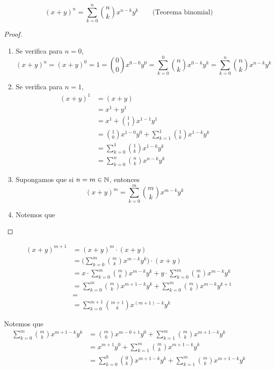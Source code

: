 \[(x+ y)^n = \sum_{k=0}^{n} \binom{n}{k} x^{n-k}y^k \qquad \text{(Teorema binomial)}\]

\begin{proof}\leavevmode
  
  \begin{enumerate}[label=\roman*)]
    \item Se verifica para $n=0$, \[(x+ y)^n = (x+ y)^0= 1= \binom{0}{0} x^{0-0}y^0= \sum_{k=0}^{0} \binom{n}{k} x^{0-k}y^k= \sum_{k=0}^{n} \binom{n}{k} x^{n-k}y^k\]
    \item Se verifica para $n=1$,
    \begin{align*}
      (x+ y)^1 &= (x+ y)\\
      &= x^1 + y^1\\
      &= x^1 + \binom{1}{1}x^{1-1}y^1\\
      &= \binom{1}{0} x^{1-0}y^0 + \sum_{k=1}^{1} \binom{1}{k} x^{1-k}y^k\\
      &= \sum_{k=0}^{1} \binom{1}{k} x^{1-k}y^k\\
      &= \sum_{k=0}^{n} \binom{n}{k} x^{n-k}y^k
    \end{align*}
    \item Supongamos que si $n=m\in \mathbb{N}$, entonces \[(x+ y)^m = \sum_{k=0}^{m} \binom{m}{k} x^{m-k}y^k\]
    \item Notemos que 
  \end{enumerate}
\end{proof}

\begin{align*}
  (x+ y)^{m+1} &= (x + y)^m \cdot (x+ y)\\
  &= \Bigg(\sum_{k=0}^{m} \binom{m}{k} x^{m-k}y^k\Bigg) \cdot (x + y)\\
  &= x \cdot \sum_{k=0}^{m} \binom{m}{k} x^{m-k}y^k + y \cdot \sum_{k=0}^{m} \binom{m}{k} x^{m-k}y^k \\
  &= \sum_{k=0}^{m} \binom{m}{k} x^{m+1-k}y^k + \sum_{k=0}^{m} \binom{m}{k} x^{m-k}y^{k+1}\\
  &= \\
  &= \sum_{k=0}^{m+1} \binom{m+1}{k} x^{(m+1)-k} y^k
  \end{align*}
  
  Notemos que
  \begin{align*}
    \sum_{k=0}^{m} \binom{m}{k} x^{m+1-k}y^k &= \binom{m}{0}x^{m-0+1}y^0 +\sum_{k=1}^{m} \binom{m}{k} x^{m+1-k}y^k\\
    &= x^{m+1} y^0 +\sum_{k=1}^{m} \binom{m}{k} x^{m+1-k}y^k\\
    &= \sum_{k=0}^{0} \binom{0}{k} x^{m+1-k} y^k +\sum_{k=1}^{m} \binom{m}{k} x^{m+1-k}y^k\\
  \end{align*}
  
